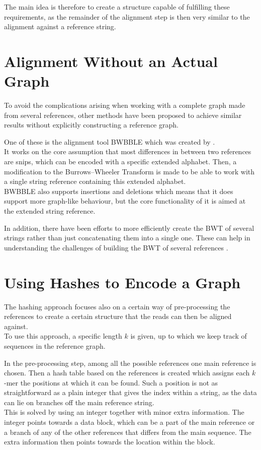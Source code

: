 \documentclass[a4paper,12pt,twoside,BCOR=10mm]{scrbook}
\begin{document}
The main idea is therefore to create a structure capable of fulfilling these requirements,
as the remainder of the alignment step is then very similar to the alignment against a reference string.

\section{Alignment Without an Actual Graph}

To avoid the complications arising when working with
a complete graph made from several references, other methods have been proposed
to achieve similar results without explicitly constructing a reference graph.

One of these is the alignment tool BWBBLE which
was created by \citet{Huang2013}. \\
It works on the core assumption that most differences in between two references
are snips, which can be encoded with a specific extended alphabet.
Then, a modification to the Burrows--Wheeler Transform is made to
be able to work with a single string reference containing this extended alphabet. \\
BWBBLE also supports insertions and deletions which means that it does support
more graph-like behaviour, but the core functionality of it is aimed at the extended string reference.

In addition, there have been efforts to more efficiently create the BWT
of several strings rather than just concatenating them into a single one.
These can help in understanding the challenges of building the BWT of several references \citep{Holt2014}.

\section{Using Hashes to Encode a Graph}

The hashing approach focuses also on a certain way of pre-processing the references
to create a certain structure that the reads can then be aligned against. \\
To use this approach, a specific length $ k $ is given, up to which we keep track of
sequences in the reference graph.

In the pre-processing step, among all the possible references one main reference is chosen.
Then a hash table based on the references is created which
assigns each $ k $-mer the positions at which it can be found.
Such a position is not as straightforward as a
plain integer that gives the index within a string, as the data can lie on branches
off the main reference string. \\
This is solved by using an integer together with minor extra information.
The integer points towards a data block, which can be a part of the main
reference or a branch of any of the other references that differs from the
main sequence. The extra information then points towards the location within the block.
\end{document}
